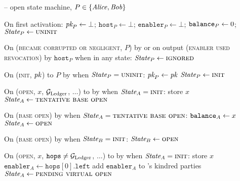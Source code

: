 \begin{center}
  \begin{systembox}{\fchan{} -- open state machine, $P \in \{\mathit{Alice}, \mathit{Bob}\}$}
    \begin{algorithmic}[1]
      \State On first activation: 
      \label{code:functionality:open:boot}
      \Indent
        \State $\textit{pk}_{P} \gets \bot$; $\texttt{host}_P \gets \bot$;
        $\texttt{enabler}_P \gets \bot$; $\texttt{balance}_{P} \gets 0$;
        \State $\itistate_P \gets \textsc{uninit}$
      \EndIndent
      \Statex

      \State On (\textsc{became corrupted or negligent}, $P$) by \adversary or
      on output (\textsc{enabler used revocation}) by $\texttt{host}_P$ when in
      any state:
      \label{code:functionality:open:when-ignored}
      \Indent
        \State $\itistate_P \gets \textsc{ignored}$
      \EndIndent
      \Statex

      \State On (\textsc{init}, $\textit{pk}_{}$) to $P$ by \environment when
      $\itistate_P = \textsc{uninit}$:
      \Indent
        \State $\textit{pk}_{P} \gets \textit{pk}_{}$
        \State $\itistate_P \gets \textsc{init}$
      \EndIndent
      \Statex

      \State On (\textsc{open}, $x$, $\mathcal{G}_{\mathrm{Ledger}}$, $\dots$) to \alice by
      \environment when $\itistate_A = \textsc{init}$:
      \Indent
        \State store $x$
        \label{code:functionality:open:store}
        \State $\itistate_A \gets \textsc{tentative base open}$
      \EndIndent
      \Statex

      \State On (\textsc{base open}) by \adversary when $\itistate_A =
      \textsc{tentative base open}$:
      \Indent
        \State $\texttt{balance}_{A} \gets x$
        \label{code:functionality:open:base-balance}
        \State $\itistate_A \gets \textsc{open}$
      \EndIndent
      \Statex

      \State On (\textsc{base open}) by \adversary when $\itistate_B =
      \textsc{init}$:
      \label{code:functionality:open:when-open-bob}
      \Indent
        \State $\itistate_B \gets \textsc{open}$
      \EndIndent
      \Statex

      \State On (\textsc{open}, $x$, $\texttt{hops} \neq \mathcal{G}_{\mathrm{Ledger}}$, $\dots$) to
      \alice by \environment when $\itistate_A = \textsc{init}$:
      \Indent
        \State store $x$
        \State $\texttt{enabler}_A \gets \texttt{hops}[0].\texttt{left}$
        \State add $\texttt{enabler}_A$ to \alice's kindred parties
        \State $\itistate_A \gets \textsc{pending virtual open}$
      \EndIndent
      \Statex


\end{algorithmic}
\end{systembox}
\end{center}

